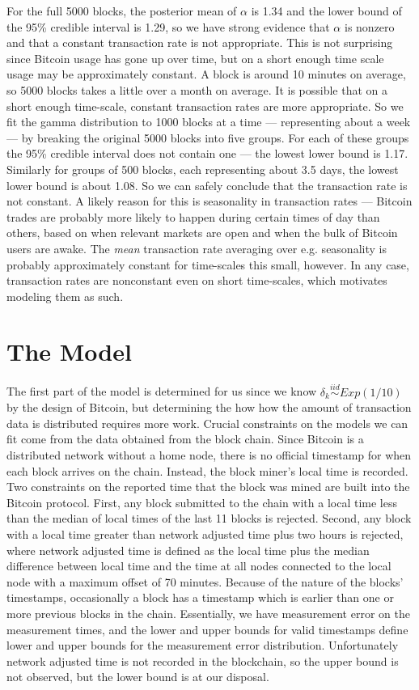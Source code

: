 \documentclass{article}
\begin{document}
For the full 5000 blocks, the posterior mean of $\alpha$ is 1.34 and the lower bound of the 95\% credible interval is 1.29, so we have strong evidence that $\alpha$ is nonzero and that a constant transaction rate is not appropriate. This is not surprising since Bitcoin usage has gone up over time, but on a short enough time scale usage may be approximately constant. A block is around 10 minutes on average, so 5000 blocks takes a little over a month on average. It is possible that on a short enough time-scale, constant transaction rates are more appropriate. So we fit the gamma distribution to 1000 blocks at a time --- representing about a week --- by breaking the original 5000 blocks into five groups. For each of these groups the 95\% credible interval does not contain one --- the lowest lower bound is 1.17. Similarly for groups of 500 blocks, each representing about 3.5 days, the lowest lower bound is about 1.08. So we can safely conclude that the transaction rate is not constant. A likely reason for this is seasonality in transaction rates --- Bitcoin trades are probably more likely to happen during certain times of day than others, based on when relevant markets are open and when the bulk of Bitcoin users are awake. The {\it mean} transaction rate averaging over e.g. seasonality is probably approximately constant for time-scales this small, however. In any case, transaction rates are nonconstant even on short time-scales, which motivates modeling them as such.

\section{The Model}

The first part of the model is determined for us since we know $\delta_k\stackrel{iid}{\sim} Exp(1/10)$ by the design of Bitcoin, but determining the how how the amount of transaction data is distributed requires more work. Crucial constraints on the models we can fit come from the data obtained from the block chain. Since Bitcoin is a distributed network without a home node, there is no official timestamp for when each block arrives on the chain. Instead, the block miner's local time is recorded. Two constraints on the reported time that the block was mined are built into the Bitcoin protocol. First, any block submitted to the chain with a local time less than the median of local times of the last 11 blocks is rejected. Second, any block with a local time greater than network adjusted time plus two hours is rejected, where network adjusted time is defined as the local time plus the median difference between local time and the time at all nodes connected to the local node with a maximum offset of 70 minutes. Because of the nature of the blocks' timestamps, occasionally a block has a timestamp which is earlier than one or more previous blocks in the chain. Essentially, we have measurement error on the measurement times, and the lower and upper bounds for valid timestamps define lower and upper bounds for the measurement error distribution. Unfortunately network adjusted time is not recorded in the blockchain, so the upper bound is not observed, but the lower bound is at our disposal.
\end{document}
